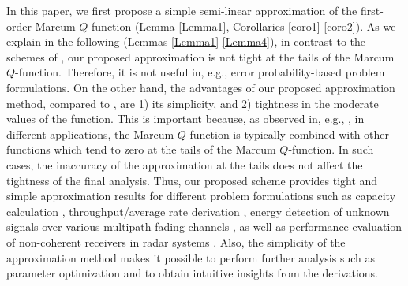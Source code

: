 In this paper, we first propose a simple semi-linear approximation of the first-order Marcum $Q$-function (Lemma \ref{Lemma1}, Corollaries \ref{coro1}-\ref{coro2}). As we explain in the following (Lemmas \ref{Lemma1}-\ref{Lemma4}), in contrast to the schemes of \cite{Bocus2013CLapproximation,Fu2011GLOBECOMexponential,zhao2008ELtight,Simon2000TCexponential,annamalai2001WCMCcauchy,Sofotasios2010ISWCSnovel,Li2010TCnew,andras2011Mathematicageneralized,Gaur2003TVTsome,Kam2008TCcomputing,Corazza2002TITnew,Baricz2009TITnew,chiani1999ELintegral,jimenez2014connection}, our proposed approximation is not tight at the tails of  the Marcum $Q$-function. Therefore, it is not useful in, e.g., error probability-based problem formulations.  On the other hand, the advantages of our proposed approximation method, compared to \cite{Bocus2013CLapproximation,Fu2011GLOBECOMexponential,zhao2008ELtight,Simon2000TCexponential,annamalai2001WCMCcauchy,Sofotasios2010ISWCSnovel,Li2010TCnew,andras2011Mathematicageneralized,Gaur2003TVTsome,Kam2008TCcomputing,Corazza2002TITnew,Baricz2009TITnew,chiani1999ELintegral,jimenez2014connection}, are 1) its simplicity, and 2) tightness in the moderate values of the function. This is important because, as observed in, e.g., \cite{Bocus2013CLapproximation,Fu2011GLOBECOMexponential,Makki2013TCfeedback,Makki2011Eurasipcapacity,Makki2018WCLwireless,Makki2016TVTperformance,Simon2003TWCsome,Suraweera2010TVTcapacity,Ma2000JSACunified,Digham2007TCenergy,Cao2016CLsolutions,sofotasios2015solutions,Azari2018TCultra,Alam2014INFOCOMWrobust,Gao2018IAadmm,Shen2018TVToutage,Song2017JLTimpact,Tang2019IAan}, in different applications, the Marcum $Q$-function is typically combined with other functions which tend to zero at the tails of the Marcum $Q$-function. In such cases, the inaccuracy of the approximation at the tails does not affect the tightness of the final analysis. Thus, our proposed scheme provides tight and simple approximation results for different problem formulations such as capacity calculation \cite{Makki2011Eurasipcapacity,Suraweera2010TVTcapacity}, throughput/average rate derivation \cite{Makki2013TCfeedback,Makki2018WCLwireless,Makki2016TVTperformance}, energy detection of unknown signals over various multipath fading channels \cite{Digham2007TCenergy,Cao2016CLsolutions,sofotasios2015solutions}, as well as  performance evaluation of  non-coherent receivers in radar systems \cite{Cui2012ELtwo}. Also, the simplicity of the approximation method makes it possible to perform further analysis such as parameter optimization and to obtain intuitive insights from the derivations.


